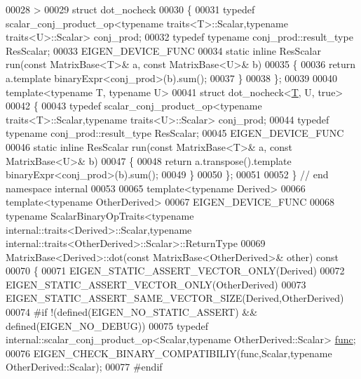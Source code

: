 \begin{DoxyCode}
00028 >
00029 \textcolor{keyword}{struct }dot\_nocheck
00030 \{
00031   \textcolor{keyword}{typedef} scalar\_conj\_product\_op<typename traits<T>::Scalar,\textcolor{keyword}{typename} traits<U>::Scalar> conj\_prod;
00032   \textcolor{keyword}{typedef} \textcolor{keyword}{typename} conj\_prod::result\_type ResScalar;
00033   EIGEN\_DEVICE\_FUNC
00034   \textcolor{keyword}{static} \textcolor{keyword}{inline} ResScalar run(\textcolor{keyword}{const} MatrixBase<T>& a, \textcolor{keyword}{const} MatrixBase<U>& b)
00035   \{
00036     \textcolor{keywordflow}{return} a.template binaryExpr<conj\_prod>(b).sum();
00037   \}
00038 \};
00039 
00040 \textcolor{keyword}{template}<\textcolor{keyword}{typename} T, \textcolor{keyword}{typename} U>
00041 \textcolor{keyword}{struct }dot\_nocheck<\hyperlink{group___sparse_core___module_class_eigen_1_1_triplet}{T}, U, true>
00042 \{
00043   \textcolor{keyword}{typedef} scalar\_conj\_product\_op<typename traits<T>::Scalar,\textcolor{keyword}{typename} traits<U>::Scalar> conj\_prod;
00044   \textcolor{keyword}{typedef} \textcolor{keyword}{typename} conj\_prod::result\_type ResScalar;
00045   EIGEN\_DEVICE\_FUNC
00046   \textcolor{keyword}{static} \textcolor{keyword}{inline} ResScalar run(\textcolor{keyword}{const} MatrixBase<T>& a, \textcolor{keyword}{const} MatrixBase<U>& b)
00047   \{
00048     \textcolor{keywordflow}{return} a.transpose().template binaryExpr<conj\_prod>(b).sum();
00049   \}
00050 \};
00051 
00052 \} \textcolor{comment}{// end namespace internal}
00053 
00065 \textcolor{keyword}{template}<\textcolor{keyword}{typename} Derived>
00066 \textcolor{keyword}{template}<\textcolor{keyword}{typename} OtherDerived>
00067 EIGEN\_DEVICE\_FUNC
00068 \textcolor{keyword}{typename} ScalarBinaryOpTraits<typename internal::traits<Derived>::Scalar,\textcolor{keyword}{typename} 
      internal::traits<OtherDerived>::Scalar>::ReturnType
00069 MatrixBase<Derived>::dot(\textcolor{keyword}{const} MatrixBase<OtherDerived>& other)\textcolor{keyword}{ const}
00070 \textcolor{keyword}{}\{
00071   EIGEN\_STATIC\_ASSERT\_VECTOR\_ONLY(Derived)
00072   EIGEN\_STATIC\_ASSERT\_VECTOR\_ONLY(OtherDerived)
00073   EIGEN\_STATIC\_ASSERT\_SAME\_VECTOR\_SIZE(Derived,OtherDerived)
00074 \textcolor{preprocessor}{#if !(defined(EIGEN\_NO\_STATIC\_ASSERT) && defined(EIGEN\_NO\_DEBUG))}
00075   \textcolor{keyword}{typedef} internal::scalar\_conj\_product\_op<Scalar,typename OtherDerived::Scalar> 
      \hyperlink{structfunc}{func};
00076   EIGEN\_CHECK\_BINARY\_COMPATIBILIY(func,Scalar,\textcolor{keyword}{typename} OtherDerived::Scalar);
00077 \textcolor{preprocessor}{#endif}

\end{DoxyCode}
